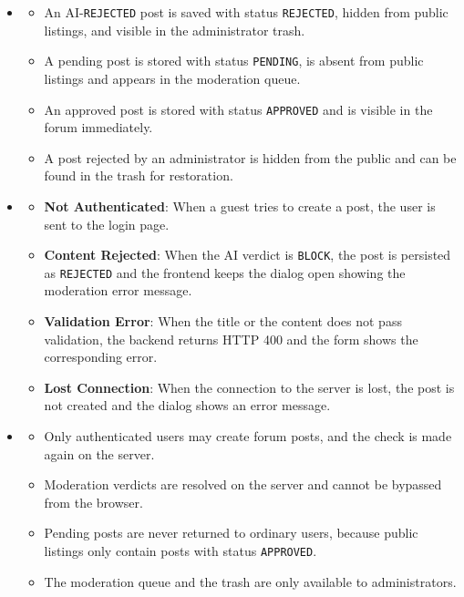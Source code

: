 \begin{itemize}[leftmargin=1.6em,topsep=4pt,itemsep=3pt,parsep=0pt,label=$\bullet$]
\begin{itemize}[leftmargin=2.2em,topsep=2pt,itemsep=3pt,parsep=0pt,label=$\circ$]
        \end{itemize}
    \item {}
        \begin{itemize}[leftmargin=2.2em,topsep=2pt,itemsep=3pt,parsep=0pt,label=$\circ$]
            \item An AI-\texttt{REJECTED} post is saved with status \texttt{REJECTED}, hidden from public listings, and visible in the administrator trash.
            \item A pending post is stored with status \texttt{PENDING}, is absent from public listings and appears in the moderation queue.
            \item An approved post is stored with status \texttt{APPROVED} and is visible in the forum immediately.
            \item A post rejected by an administrator is hidden from the public and can be found in the trash for restoration.
        \end{itemize}
    \item {}
        \begin{itemize}[leftmargin=2.2em,topsep=2pt,itemsep=3pt,parsep=0pt,label=$\circ$]
            \item \textbf{Not Authenticated}: When a guest tries to create a post, the user is sent to the login page.
            \item \textbf{Content Rejected}: When the AI verdict is \texttt{BLOCK}, the post is persisted as \texttt{REJECTED} and the frontend keeps the dialog open showing the moderation error message.
            \item \textbf{Validation Error}: When the title or the content does not pass validation, the backend returns HTTP 400 and the form shows the corresponding error.
            \item \textbf{Lost Connection}: When the connection to the server is lost, the post is not created and the dialog shows an error message.
        \end{itemize}
    \item {}
        \begin{itemize}[leftmargin=2.2em,topsep=2pt,itemsep=3pt,parsep=0pt,label=$\circ$]
            \item Only authenticated users may create forum posts, and the check is made again on the server.
            \item Moderation verdicts are resolved on the server and cannot be bypassed from the browser.
            \item Pending posts are never returned to ordinary users, because public listings only contain posts with status \texttt{APPROVED}.
            \item The moderation queue and the trash are only available to administrators.
        \end{itemize}
\end{itemize}

